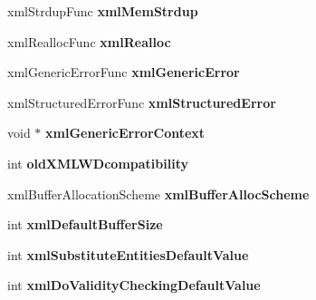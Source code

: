 \begin{DoxyCompactItemize}
\mbox{\label{struct__xml_global_state_a480efe13ea3f6855bae2e9a9f7f3a0c2}} 
xml\+Strdup\+Func {\bfseries xml\+Mem\+Strdup}
\item 
\mbox{\label{struct__xml_global_state_afe3342331af0b0563377a7967ba2fa68}} 
xml\+Realloc\+Func {\bfseries xml\+Realloc}
\item 
\mbox{\label{struct__xml_global_state_a68fec3bbfc35f99f7bff04373dbf90c2}} 
xml\+Generic\+Error\+Func {\bfseries xml\+Generic\+Error}
\item 
\mbox{\label{struct__xml_global_state_aef0f8aae9672650f571ccfdb5fe893a1}} 
xml\+Structured\+Error\+Func {\bfseries xml\+Structured\+Error}
\item 
\mbox{\label{struct__xml_global_state_a34d13a95a10b324c97ee524fb25ac0bd}} 
void $\ast$ {\bfseries xml\+Generic\+Error\+Context}
\item 
\mbox{\label{struct__xml_global_state_a3a4587d5954d544f4ca2234374d3bcd9}} 
int {\bfseries old\+X\+M\+L\+W\+Dcompatibility}
\item 
\mbox{\label{struct__xml_global_state_a4da43ce871efefda1a35b93cf442c553}} 
xml\+Buffer\+Allocation\+Scheme {\bfseries xml\+Buffer\+Alloc\+Scheme}
\item 
\mbox{\label{struct__xml_global_state_abb8a2b0c3484e57154ff709c7c8dc94b}} 
int {\bfseries xml\+Default\+Buffer\+Size}
\item 
\mbox{\label{struct__xml_global_state_a1a0fd78aa36e227f429299a808ea8bee}} 
int {\bfseries xml\+Substitute\+Entities\+Default\+Value}
\item 
\mbox{\label{struct__xml_global_state_ab94304dcd880b0c6f68634fe7fcc60ef}} 
int {\bfseries xml\+Do\+Validity\+Checking\+Default\+Value}
\item 
\mbox{\label{struct__xml_global_state_af4caac50e246cf1f1b6fc0fb9eb7ac83}} 

\end{DoxyCompactItemize}
